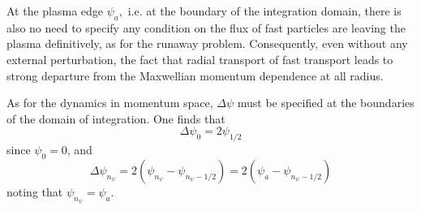 At the plasma edge $\psi _{a},$ i.e. at the boundary of the integration
domain, there is also no need to specify any condition on the flux of fast
particles are leaving the plasma definitively, as for the runaway problem.
Consequently, even without any external perturbation, the fact that radial
transport of fast transport leads to strong departure from the Maxwellian
momentum dependence at all radius.

As for the dynamics in momentum space, $\Delta \psi $ must be specified at
the boundaries of the domain of integration. One finds that
\begin{equation}
\Delta \psi _{0}=2\psi _{1/2}
\end{equation}
since $\psi _{0}=0$, and
\begin{equation}
\Delta \psi _{n_{\psi }}=2\left( \psi _{n_{\psi }}-\psi _{n_{\psi
}-1/2}\right) =2\left( \psi _{a}-\psi _{n_{\psi }-1/2}\right)
\end{equation}
noting that $\psi _{n_{\psi }}=\psi _{a}$.
